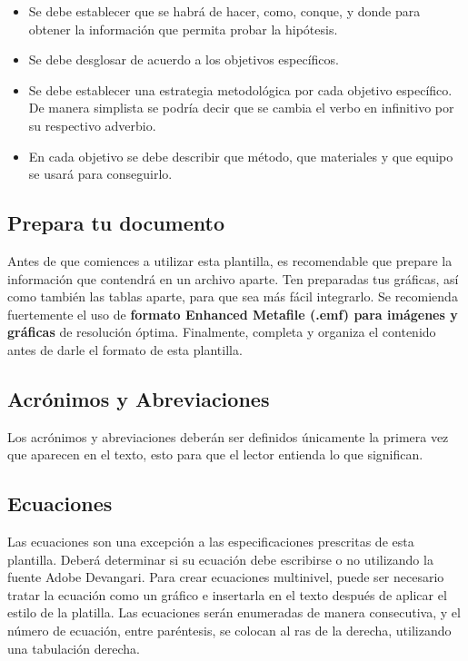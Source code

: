     \begin{itemize}
        \item Se debe establecer que se habrá de hacer, como, conque, y donde para obtener la información que permita probar la hipótesis.  
        \item Se debe desglosar de acuerdo a los objetivos específicos. 
        \item Se debe establecer una estrategia metodológica por cada objetivo específico. De manera simplista se podría decir que se cambia el verbo en infinitivo por su respectivo adverbio.
        \item En cada objetivo se debe describir que método, que materiales y que equipo se usará para conseguirlo.
    \end{itemize}
    \begin{figure}[H]
    
    \end{figure}
    
    \subsection{Prepara tu documento}
    
    Antes de que comiences a utilizar esta plantilla, es recomendable que prepare la información que contendrá en un archivo aparte. 
    Ten preparadas tus gráficas, así como también las tablas aparte, para que sea más fácil integrarlo. 
    Se recomienda fuertemente el uso de \textbf{formato Enhanced Metafile (.emf) para imágenes y gráficas} de resolución óptima. 
    Finalmente, completa y organiza el contenido antes de darle el formato de esta plantilla. 
    
    \subsection{Acrónimos y Abreviaciones}
    
    Los acrónimos y abreviaciones deberán ser definidos únicamente la primera vez que aparecen en el texto, esto para que el lector entienda lo que significan.
    
    \subsection{Ecuaciones}
    
    Las ecuaciones son una excepción a las especificaciones prescritas de esta plantilla. 
    Deberá determinar si su ecuación debe escribirse o no utilizando la fuente Adobe Devangari. 
    Para crear ecuaciones multinivel, puede ser necesario tratar la ecuación como un gráfico e insertarla en el texto después de aplicar el estilo de la platilla.
    Las ecuaciones serán enumeradas de manera consecutiva, y el número de ecuación, entre paréntesis, se colocan al ras de la derecha, utilizando una tabulación derecha. 
    
